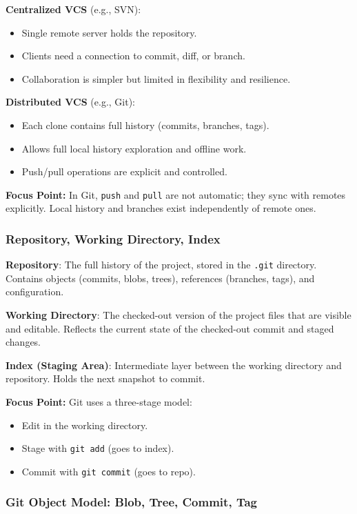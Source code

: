 \documentclass[a4paper,12pt]{article}
\begin{document}
\textbf{Centralized VCS} (e.g., SVN):
\begin{itemize}
  \item Single remote server holds the repository.
  \item Clients need a connection to commit, diff, or branch.
  \item Collaboration is simpler but limited in flexibility and resilience.
\end{itemize}

\textbf{Distributed VCS} (e.g., Git):
\begin{itemize}
  \item Each clone contains full history (commits, branches, tags).
  \item Allows full local history exploration and offline work.
  \item Push/pull operations are explicit and controlled.
\end{itemize}

\textbf{Focus Point:} In Git, \texttt{push} and \texttt{pull} are not automatic; they sync with remotes explicitly. Local history and branches exist independently of remote ones.

\subsubsection{Repository, Working Directory, Index}

\textbf{Repository}:
The full history of the project, stored in the \texttt{.git} directory. Contains objects (commits, blobs, trees), references (branches, tags), and configuration.

\textbf{Working Directory}:
The checked-out version of the project files that are visible and editable. Reflects the current state of the checked-out commit and staged changes.

\textbf{Index (Staging Area)}:
Intermediate layer between the working directory and repository. Holds the next snapshot to commit.

\textbf{Focus Point:} Git uses a three-stage model:
\begin{itemize}
  \item Edit in the working directory.
  \item Stage with \texttt{git add} (goes to index).
  \item Commit with \texttt{git commit} (goes to repo).
\end{itemize}

\subsubsection{Git Object Model: Blob, Tree, Commit, Tag}
\end{document}
